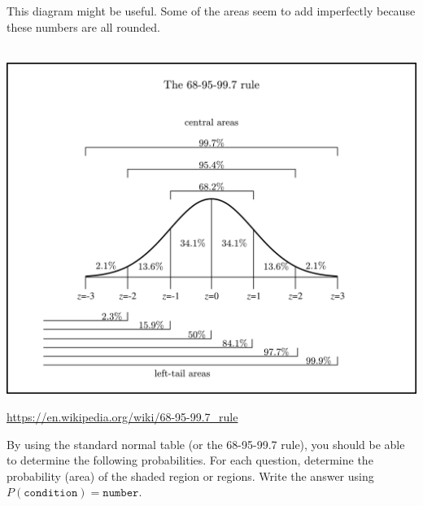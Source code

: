 \documentclass[12pt,letterpaper]{article}
\begin{document}
\newpage
This diagram might be useful. Some of the areas seem to add imperfectly because these numbers are all rounded.\\\\
\begin{center}
\includegraphics[scale=1]{toomuch2.png}
\end{center}
\url{https://en.wikipedia.org/wiki/68-95-99.7_rule}




\newpage
By using the standard normal table (or the 68-95-99.7 rule), you should be able to determine the following probabilities. For each question, determine the probability (area) of the shaded region or regions. Write the answer using $P(\texttt{condition}) = \texttt{number}$.
\end{document}

